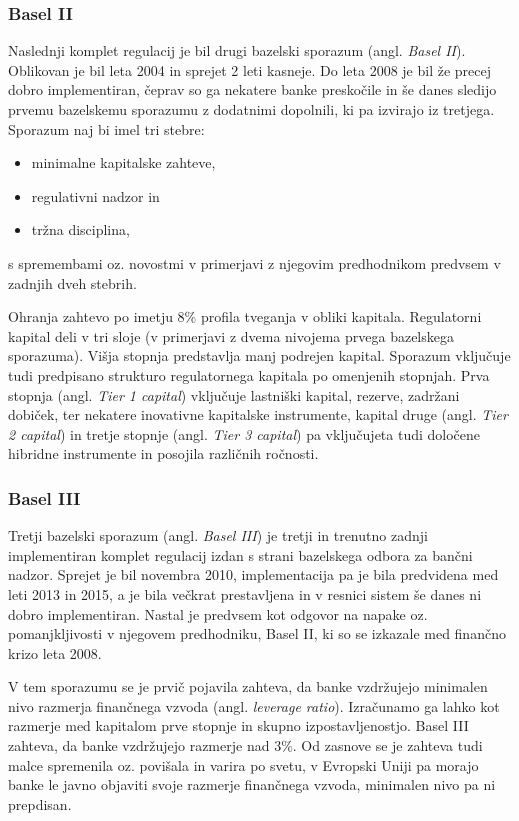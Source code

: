 \documentclass[12pt,a4paper]{amsart}
\theoremstyle{definition} %
\theoremstyle{plain} %
\begin{document}
\subsubsection{Basel II}
Naslednji komplet regulacij je bil drugi bazelski sporazum (angl. \textit{Basel II}). 
Oblikovan je bil leta 2004 in sprejet 2 leti kasneje. Do leta 2008 je bil že precej dobro 
implementiran, čeprav so ga nekatere banke preskočile in še danes sledijo 
prvemu bazelskemu sporazumu z dodatnimi dopolnili, ki pa izvirajo iz tretjega. 
Sporazum naj bi imel tri stebre:
\begin{itemize}
  \item minimalne kapitalske zahteve,
  \item regulativni nadzor in
  \item tržna disciplina,
\end{itemize}
s spremembami oz. novostmi v primerjavi z njegovim predhodnikom predvsem 
v zadnjih dveh stebrih. 

Ohranja zahtevo po imetju $8\%$ profila tveganja v obliki kapitala. Regulatorni 
kapital deli v tri sloje (v primerjavi z dvema nivojema prvega bazelskega sporazuma).
Višja stopnja predstavlja manj podrejen kapital. Sporazum vključuje tudi predpisano 
strukturo regulatornega kapitala po omenjenih stopnjah. Prva stopnja (angl. \textit{Tier 
1 capital}) vključuje lastniški kapital, rezerve, zadržani dobiček, ter nekatere 
inovativne kapitalske instrumente, kapital druge (angl. \textit{Tier 2 capital}) in 
tretje stopnje (angl. \textit{Tier 3 capital}) pa vključujeta tudi določene hibridne 
instrumente in posojila različnih ročnosti.

\subsubsection{Basel III}
Tretji bazelski sporazum (angl. \textit{Basel III}) je tretji in trenutno zadnji 
implementiran komplet regulacij izdan s strani bazelskega odbora za bančni 
nadzor. Sprejet je bil novembra 2010, implementacija pa je bila predvidena med 
leti 2013 in 2015, a je bila večkrat prestavljena in v resnici sistem še danes ni 
dobro implementiran. Nastal je predvsem kot odgovor na napake oz. pomanjkljivosti 
v njegovem predhodniku, Basel II, ki so se izkazale med finančno krizo leta 2008. 

V tem sporazumu se je prvič pojavila zahteva, da banke vzdržujejo minimalen nivo 
razmerja finančnega vzvoda (angl. \textit{leverage ratio}). Izračunamo ga lahko 
kot razmerje med kapitalom prve stopnje in skupno izpostavljenostjo. Basel III 
zahteva, da banke vzdržujejo razmerje nad $3\%$. Od zasnove se je zahteva 
tudi malce spremenila oz. povišala in varira po svetu, v Evropski Uniji pa morajo banke le javno 
objaviti svoje razmerje finančnega vzvoda, minimalen nivo pa ni prepdisan. 
\end{document}
